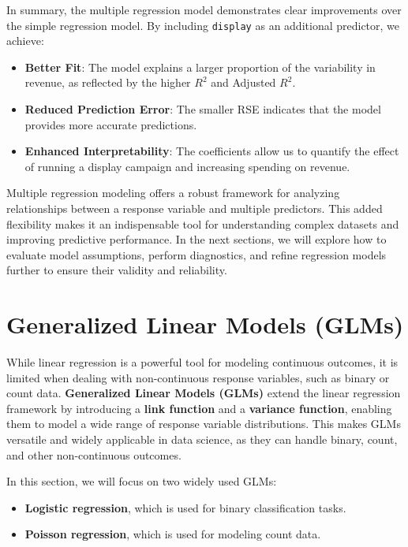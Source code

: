 \documentclass[
]{book}
\newcommand{\passthrough}[1]{#1}
\providecommand{\tightlist}{%
  \setlength{\itemsep}{0pt}\setlength{\parskip}{0pt}}
\theoremstyle{definition}
\theoremstyle{definition}
\theoremstyle{definition}
\theoremstyle{definition}
\theoremstyle{remark}
\begin{document}
In summary, the multiple regression model demonstrates clear improvements over the simple regression model. By including \passthrough{\lstinline!display!} as an additional predictor, we achieve:

\begin{itemize}
\tightlist
\item
  \textbf{Better Fit}: The model explains a larger proportion of the variability in revenue, as reflected by the higher \(R^2\) and Adjusted \(R^2\).\\
\item
  \textbf{Reduced Prediction Error}: The smaller RSE indicates that the model provides more accurate predictions.\\
\item
  \textbf{Enhanced Interpretability}: The coefficients allow us to quantify the effect of running a display campaign and increasing spending on revenue.
\end{itemize}

Multiple regression modeling offers a robust framework for analyzing relationships between a response variable and multiple predictors. This added flexibility makes it an indispensable tool for understanding complex datasets and improving predictive performance. In the next sections, we will explore how to evaluate model assumptions, perform diagnostics, and refine regression models further to ensure their validity and reliability.

\section{Generalized Linear Models (GLMs)}\label{generalized-linear-models-glms}

While linear regression is a powerful tool for modeling continuous outcomes, it is limited when dealing with non-continuous response variables, such as binary or count data. \textbf{Generalized Linear Models (GLMs)} extend the linear regression framework by introducing a \textbf{link function} and a \textbf{variance function}, enabling them to model a wide range of response variable distributions. This makes GLMs versatile and widely applicable in data science, as they can handle binary, count, and other non-continuous outcomes.

In this section, we will focus on two widely used GLMs:

\begin{itemize}
\tightlist
\item
  \textbf{Logistic regression}, which is used for binary classification tasks.
\item
  \textbf{Poisson regression}, which is used for modeling count data.
\end{itemize}
\end{document}
